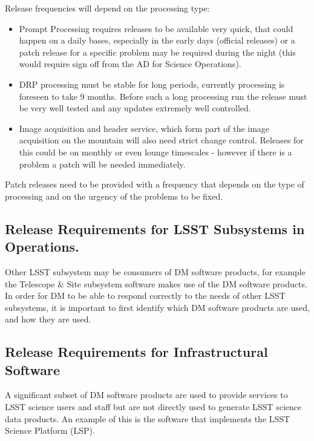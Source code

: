 Release frequencies will depend on the processing type:
\begin{itemize}
\item Prompt Processing requires releases to be available very quick, that could happen on a daily bases, especially in the early days (official releases)
 or a  patch release  for a specific problem may be required during the night (this would require sign off from the \gls{AD} for Science \gls{Operations}).
\item \gls{DRP} processing  must be stable for long periods, currently processing is foreseen to take 9 months.  Before such a long processing run the release must be very well tested and any updates extremely well controlled.
\item Image acquisition and header service, which form part of the image acquisition on the mountain will also need strict change control. Releases for this could be on monthly or even lounge timescales - however if there is a problem a patch will be needed immediately.
\end{itemize}

Patch releases need to be provided with a frequency that depends on the type of processing
and on the urgency of the problems to be fixed.


\subsection{Release Requirements for \gls{LSST} Subsystems in \gls{Operations}.} \label{sec:otherreqs}

Other \gls{LSST} subsystem may be consumers of \gls{DM} software products, for example the Telescope \& Site subsystem software makes use of the \gls{DM} software products.
In order for \gls{DM} to be able to respond correctly to the needs of other \gls{LSST} subsystems, it is important to first identify which \gls{DM} software products are used, and how they are used.


\subsection{Release Requirements for Infrastructural Software} \label{sec:infreqs}

A significant subset of \gls{DM} software products are used to provide services to \gls{LSST} science users and staff but are not directly used to generate \gls{LSST} science data products. An example of this is the software that implements the \gls{LSST} \gls{Science Platform} (\gls{LSP}).


